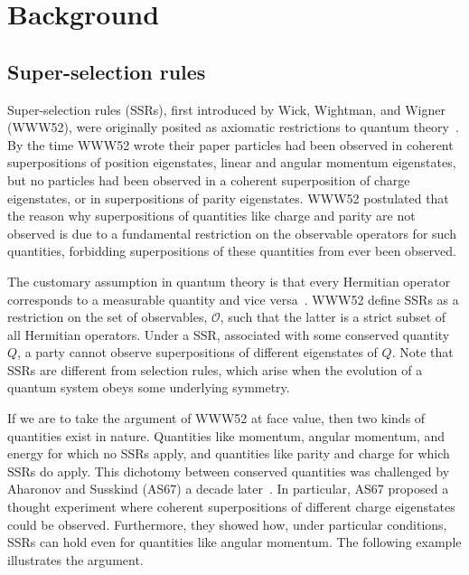 \section{Background}
\subsection{\label{SSR}Super-selection rules} 
Super-selection rules (SSRs), first introduced by Wick, Wightman, and Wigner (WWW52),  were originally posited as axiomatic restrictions to quantum theory~\cite{WWW52}. By the time  WWW52 wrote their paper particles had been observed in coherent superpositions of position eigenstates, linear and angular momentum eigenstates, but no particles had been observed in a coherent superposition of charge eigenstates, or in superpositions of parity eigenstates. WWW52 postulated that the reason why superpositions of quantities like charge and parity are not observed is due to a fundamental restriction on the observable operators for such quantities, forbidding superpositions of these quantities from ever been observed.
  
The customary assumption in quantum theory is that every Hermitian operator corresponds to a measurable quantity and vice versa~\cite{vN55}.  WWW52 define SSRs as a restriction on the set of observables, $\mathcal{O}$,  such that the latter is a strict subset of all Hermitian operators.  Under a SSR, associated with some conserved quantity $Q$, a party cannot observe superpositions of different eigenstates of $Q$.  Note that SSRs are different from selection rules, which arise when the evolution of a quantum system obeys some underlying symmetry.

If we are to take the argument of WWW52 at face value, then two kinds of quantities exist in nature.  Quantities like momentum, angular momentum, and energy for which no SSRs apply, and quantities like parity and charge for which SSRs do apply.  This dichotomy between conserved quantities was challenged by Aharonov and Susskind (AS67) a decade later~\cite{AS67}.  In particular, AS67 proposed a thought experiment where coherent superpositions of different charge eigenstates could be observed.  Furthermore, they showed how, under particular conditions, SSRs can hold even for quantities like angular momentum.  The following example illustrates the argument.

